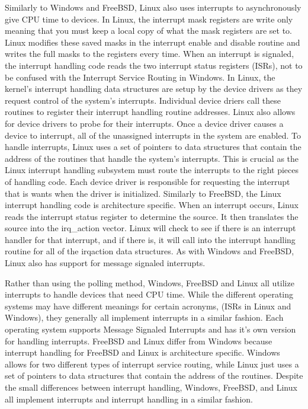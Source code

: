 \documentclass[letterpaper,10pt,draftclsnofoot,onecolumn,titlepage]{IEEEtran}
\begin{document}
		Similarly to Windows and FreeBSD, Linux also uses interrupts to asynchronously give CPU time to devices. \cite{Linux}
		In Linux, the interrupt mask registers are write only meaning that you must keep a local copy of what the mask registers are set to.
		Linux modifies these saved masks in the interrupt enable and disable routine and writes the full masks to the registers every time.
		When an interrupt is signaled, the interrupt handling code reads the two interrupt status registers (ISRs), not to be confused with the Interrupt Service Routing in Windows.
		In Linux, the kernel's interrupt handling data structures are setup by the device drivers as they request control of the system's interrupts.
		Individual device driers call these routines to register their interrupt handling routine addresses.
		Linux also allows for device drivers to probe for their interrupts. Once a device driver causes a device to interrupt, all of the unassigned interrupts in the system are enabled.
		To handle interrupts, Linux uses a set of pointers to data structures that contain the address of the routines that handle the system's interrupts.
		This is crucial as the Linux interrupt handling subsystem must route the interrupts to the right pieces of handling code.
		Each device driver is responsible for requesting the interrupt that is wants when the driver is initialized.
		Similarly to FreeBSD, the Linux interrupt handling code is architecture specific.
		When an interrupt occurs, Linux reads the interrupt status register to determine the source. It then translates the source into the irq\_action vector.
		Linux will check to see if there is an interrupt handler for that interrupt, and if there is, it will call into the interrupt handling routine for all of the irqaction data structures.
		As with Windows and FreeBSD, Linux also has support for message signaled interrupts.


		Rather than using the polling method, Windows, FreeBSD and Linux all utilize interrupts to handle devices that need CPU time.
		While the different operating systems may have different meanings for certain acronyms, (ISRs in Linux and Windows), they generally all implement interrupts in a similar fashion.
		Each operating system supports Message Signaled Interrupts and has it's own version for handling interrupts.
		FreeBSD and Linux differ from Windows because interrupt handling for FreeBSD and Linux is architecture specific.
		Windows allows for two different types of interrupt service routing, while Linux just uses a set of pointers to data structures that contain the address of the routines.
		Despite the small differences between interrupt handling, Windows, FreeBSD, and Linux all implement interrupts and interrupt handling in a similar fashion.
\end{document}
